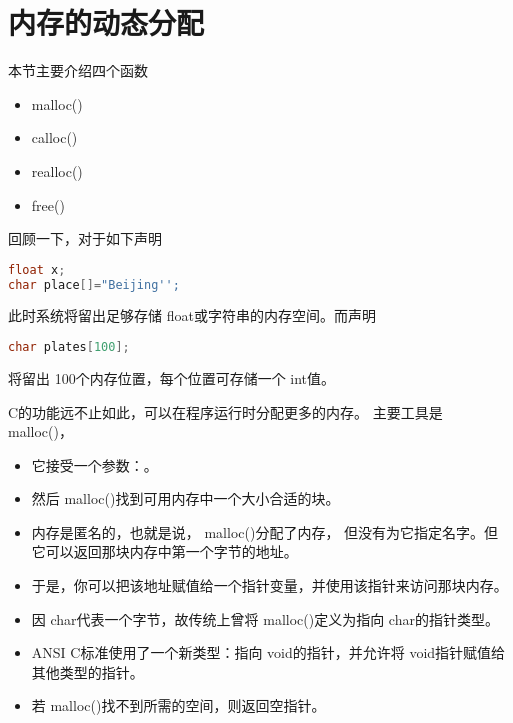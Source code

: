 \section{内存的动态分配}

\begin{frame}[fragile]\ft{\secname}
  本节主要介绍四个函数
  \begin{itemize}
  \item {malloc()}
  \item {calloc()}
  \item {realloc()}
  \item {free()}
  \end{itemize}
\end{frame}


\begin{frame}[fragile]\ft{\secname}
回顾一下，对于如下声明
\begin{lstlisting}[language=c,backgroundcolor=\color{red!20}]
float x;
char place[]="Beijing'';  
\end{lstlisting}
此时系统将留出足够存储{ float}或字符串的内存空间。而声明
\begin{lstlisting}[language=c,backgroundcolor=\color{red!20}]
char plates[100];  
\end{lstlisting}
将留出{ 100}个内存位置，每个位置可存储一个{ int}值。
\end{frame}

\begin{frame}[fragile]\ft{\secname}
  C的功能远不止如此，可以在程序运行时分配更多的内存。  
  主要工具是{ malloc()}，
  \begin{itemize}
  \item 
    它接受一个参数：。
  \item
    然后{ malloc()}找到可用内存中一个大小合适的块。
  \item
    内存是匿名的，也就是说，{ malloc()}分配了内存，
    但没有为它指定名字。但它可以返回那块内存中第一个字节的地址。
  \item
    于是，你可以把该地址赋值给一个指针变量，并使用该指针来访问那块内存。
  \end{itemize}
\end{frame}


\begin{frame}[fragile]\ft{\secname}

  \begin{itemize}
  \item 
    因{ char}代表一个字节，故传统上曾将{ malloc()}定义为指向{ char}的指针类型。
  \item
    { ANSI C}标准使用了一个新类型：指向{ void}的指针，并允许将{ void}指针赋值给其他类型的指针。
  \item
    若{ malloc()}找不到所需的空间，则返回空指针。
  \end{itemize}
  
\end{frame}


